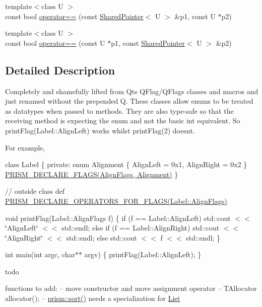 \begin{DoxyCompactItemize}
\item 
{\footnotesize template$<$class U $>$ }\\const bool \hyperlink{namespaceprism_a2b73e87f080646696ed6b595a3900119}{operator==} (const \hyperlink{classprism_1_1_shared_pointer}{Shared\+Pointer}$<$ U $>$ \&p1, const U $\ast$p2)
\item 
{\footnotesize template$<$class U $>$ }\\const bool \hyperlink{namespaceprism_a1f29b22985dc0ec1fc548a551ce313ed}{operator==} (const U $\ast$p1, const \hyperlink{classprism_1_1_shared_pointer}{Shared\+Pointer}$<$ U $>$ \&p2)
\end{DoxyCompactItemize}


\subsection{Detailed Description}
Completely and shamefully lifted from Qt\textquotesingle{}s Q\+Flag/\+Q\+Flags classes and macros and just renamed without the prepended \textquotesingle{}Q\textquotesingle{}. These classes allow enums to be treated as datatypes when passed to methods. They are also type-\/safe so that the receiving method is expecting the enum and not the basic int equivalent. So print\+Flag(\+Label\+::\+Align\+Left) works whilst print\+Flag(2) doesn\textquotesingle{}t.

For example,

class Label \{ private\+: enum Alignment \{ Align\+Left = 0x1, Align\+Right = 0x2 \} \hyperlink{_flags_8h_aa5aa2c9827ab949836e20999b9a068ec}{P\+R\+I\+S\+M\+\_\+\+D\+E\+C\+L\+A\+R\+E\+\_\+\+F\+L\+A\+G\+S(\+Align\+Flags, Alignment)} \}

// outside class def \hyperlink{_flags_8h_ae8aabb683a18b872a4449769b82e8e15}{P\+R\+I\+S\+M\+\_\+\+D\+E\+C\+L\+A\+R\+E\+\_\+\+O\+P\+E\+R\+A\+T\+O\+R\+S\+\_\+\+F\+O\+R\+\_\+\+F\+L\+A\+G\+S(\+Label\+::\+Align\+Flags)}

void print\+Flag(\+Label\+::\+Align\+Flags f) \{ if (f == Label\+::\+Align\+Left) std\+::cout $<$$<$ \char`\"{}\+Align\+Left\char`\"{} $<$$<$ std\+::endl; else if (f == Label\+::\+Align\+Right) std\+::cout $<$$<$ \char`\"{}\+Align\+Right\char`\"{} $<$$<$ std\+::endl; else std\+::cout $<$$<$ f $<$$<$ std\+::endl; \}

int main(int argc, char$\ast$$\ast$ argv) \{ print\+Flag(\+Label\+::\+Align\+Left); \}

todo

functions to add\+: -- move constructor and move assignment operator -- T\+Allocator allocator(); -- \hyperlink{namespaceprism_addfe9ea0146b59b2b16adee4cd2220b9}{prism\+::sort()} needs a specialization for \hyperlink{classprism_1_1_list}{List}

